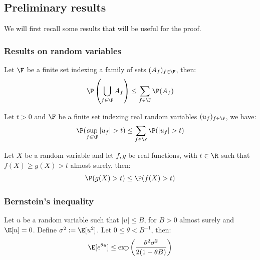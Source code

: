\documentclass[toc, titlepaged]{../cs-classes/cs-classes}
\begin{document}
\subsection{Preliminary results}
We will first recall some results that will be useful for the proof.
\subsubsection{Results on random variables}
\begin{lemma}
    Let $\F$ be a finite set indexing a family of sets $(A_f)_{f\in\F}$, then:
    \begin{equation*}
        \P\left(\bigcup_{f\in\F}A_f\right)\leq\sum_{f\in\F}\P(A_f)
    \end{equation*}
\end{lemma}

\begin{lemma}
    \label{lem:sup-rand-var}
    Let $t>0$ and $\F$ be a finite set indexing real random variables $(u_f)_{f\in\F}$, we have:
    \begin{equation*}
        \P(\sup_{f\in\F}|u_f|>t) \leq \sum_{f\in\F} \P(|u_f|>t)
    \end{equation*}
\end{lemma}

\begin{property}
    \label{prop:prob-maj}
    Let $X$ be a random variable and let $f, g$ be real functions, with $t\in\R$ such that $f(X)\geq g(X)>t$ almost surely, then:
    \begin{equation*}
        \P(g(X)>t)\leq\P(f(X)>t)
    \end{equation*}
\end{property}

\subsubsection{Bernstein's inequality}
\begin{lemma}
    Let $u$ be a random variable such that $|u|\leq B$, for $B>0$ almost surely and $\E[u]=0$. Define $\sigma^2:=\E[u^2]$. Let $0\leq\theta<B^{-1}$, then:
    \begin{equation*}
        \E[e^{\theta u}]\leq \exp\left(\frac{\theta^2\sigma^2}{2(1-\theta B)}\right)
    \end{equation*}
\end{lemma}
\end{document}
